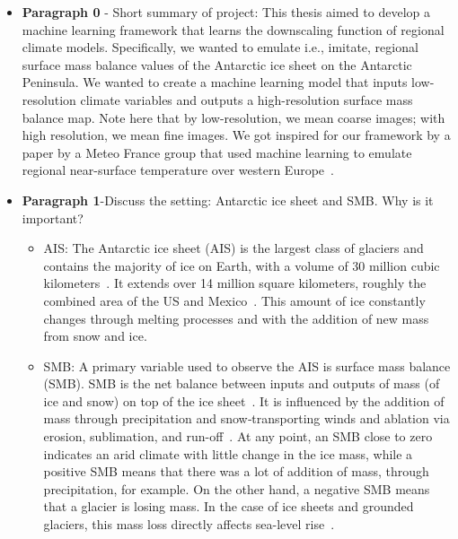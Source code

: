 \documentclass[a4paper,11pt,oneside]{report}
\begin{document}
 
\begin{itemize}
    
    \item \textbf{Paragraph 0} - Short summary of project: This thesis aimed to develop a machine learning framework that learns the downscaling function of regional climate models. Specifically, we wanted to emulate i.e., imitate, regional surface mass balance values of the Antarctic ice sheet on the Antarctic Peninsula. We wanted to create a machine learning model that inputs low-resolution climate variables and outputs a high-resolution surface mass balance map. Note here that by low-resolution, we mean coarse images; with high resolution, we mean fine images. We got inspired for our framework by a paper by a Meteo France group that used machine learning to emulate regional near-surface temperature over western Europe~\cite{Doury}.
    \item \textbf{Paragraph 1}-Discuss the setting: Antarctic ice sheet and SMB. Why is it important?
    \begin{itemize}
        \item AIS: The Antarctic ice sheet (AIS) is the largest class of glaciers and contains the majority of ice on Earth, with a volume of 30 million cubic kilometers~\cite{Icesheetsquick}. It extends over 14 million square kilometers, roughly the combined area of the US and Mexico~\cite{AntarcticIceSheet}. This amount of ice constantly changes through melting processes and with the addition of new mass from snow and ice.
        \item SMB: A primary variable used to observe the AIS is surface mass balance (SMB). SMB is the net balance between inputs and outputs of mass (of ice and snow) on top of the ice sheet~\cite{Lenaerts2019}. It is influenced by the addition of mass through precipitation and snow‐transporting winds and ablation via erosion, sublimation, and run-off~\cite{Kittel}. At any point, an SMB close to zero indicates an arid climate with little change in the ice mass, while a positive SMB means that there was a lot of addition of mass, through precipitation, for example. On the other hand, a negative SMB means that a glacier is losing mass. In the case of ice sheets and grounded glaciers, this mass loss directly affects sea-level rise~\cite{icesheet}. 
        

\end{itemize}
\end{itemize}
\end{document}
